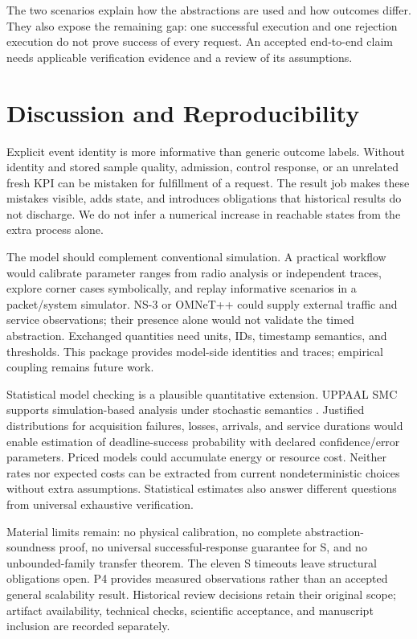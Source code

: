 \documentclass[runningheads]{llncs}
\begin{document}
The two scenarios explain how the abstractions are used and how outcomes differ. They also expose the remaining gap: one successful execution and one rejection execution do not prove success of every request. An accepted end-to-end claim needs applicable verification evidence and a review of its assumptions.

\section{Discussion and Reproducibility}\label{sec:discussion}
Explicit event identity is more informative than generic outcome labels. Without identity and stored sample quality, admission, control response, or an unrelated fresh KPI can be mistaken for fulfillment of a request. The result job makes these mistakes visible, adds state, and introduces obligations that historical results do not discharge. We do not infer a numerical increase in reachable states from the extra process alone.

The model should complement conventional simulation. A practical workflow would calibrate parameter ranges from radio analysis or independent traces, explore corner cases symbolically, and replay informative scenarios in a packet/system simulator. NS-3 or OMNeT++ \cite{ns3_manual,omnetpp_manual} could supply external traffic and service observations; their presence alone would not validate the timed abstraction. Exchanged quantities need units, IDs, timestamp semantics, and thresholds. This package provides model-side identities and traces; empirical coupling remains future work.

Statistical model checking is a plausible quantitative extension. UPPAAL SMC supports simulation-based analysis under stochastic semantics \cite{uppaal_smc_2015}. Justified distributions for acquisition failures, losses, arrivals, and service durations would enable estimation of deadline-success probability with declared confidence/error parameters. Priced models could accumulate energy or resource cost. Neither rates nor expected costs can be extracted from current nondeterministic choices without extra assumptions. Statistical estimates also answer different questions from universal exhaustive verification.

Material limits remain: no physical calibration, no complete abstraction-soundness proof, no universal successful-response guarantee for S, and no unbounded-family transfer theorem. The eleven S timeouts leave structural obligations open. P4 provides measured observations rather than an accepted general scalability result. Historical review decisions retain their original scope; artifact availability, technical checks, scientific acceptance, and manuscript inclusion are recorded separately.
\end{document}
